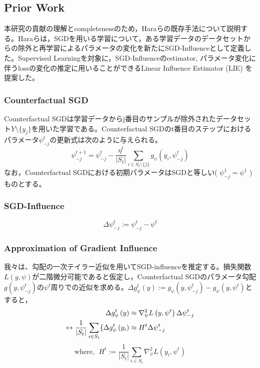 \documentclass{article}
\begin{document}
    \subsection{Prior Work}
        本研究の貢献の理解とcompletenessのため，Haraらの既存手法\cite{Hara2019}について説明する。Haraらは，SGDを用いる学習について，ある学習データのデータセットからの除外と再学習によるパラメータの変化を新たにSGD-Influenceとして定義した。Supervised Learningを対象に，SGD-Influenceのestimator, パラメータ変化に伴うlossの変化の推定に用いることができるLinear Influence Estimator (LIE) を提案した。
        \subsubsection{Counterfactual SGD}
            Counterfactual SGDは学習データからj番目のサンプルが除外されたデータセット\( Y\setminus\{y_j\}\)を用いた学習である。Counterfactual SGDのt番目のステップにおけるパラメータ\(\psi_{-j}^t\)の更新式は次のように与えられる。
            \begin{equation}
                \psi_{-j} ^{t+1} 
                = \psi_{-j} ^{t} 
                -\frac{\eta^{t}}{ \vert S_{t} \vert }  \sum _{i \in S_{t}\setminus\{j\}} g_\psi\left( y_{i},\psi_{-j}^{t}\right)
            \end{equation}
            なお，Counterfactual SGDにおける初期パラメータはSGDと等しい( \(\psi _{-j}^{1}= \psi ^{1} \) )ものとする。
        \subsubsection{SGD-Influence}
            
            \begin{equation}
              \Delta  \psi _{-j}^{t}:= \psi _{-j}^{t}- \psi ^{t}  
            \end{equation}
        
        \subsubsection{Approximation of Gradient Influence}
            我々は、勾配の一次テイラー近似を用いてSGD-influenceを推定する。損失関数\(L \left( y, \psi \right)\)が二階微分可能であると仮定し，Counterfactual SGDのパラメータ勾配\(g\left( y,\psi_{-j}^{t}\right)\)の\(\psi^t\)周りでの近似を求める。\(\Delta g_\psi^t\left( y \right) :=  g_{\psi} \left( y, \psi _{-j}^{t} \right) -g_{\psi} \left( y, \psi ^{t} \right)\)とすると，
            \begin{align}
                \Delta g_\psi^t\left( y \right) &\approx \nabla _{ \psi }^{2}L \left( y, \psi ^{t} \right) \Delta  \psi _{-j}^{t} \notag \\
                \leftrightarrow \frac{1}{ \vert S_{t} \vert } \sum _{i \in S_{t}} \{  \Delta g_\psi^t\left( y_i \right) &\approx H^{t} \Delta  \psi _{-j}^{t}
                \label{taylor}
            \end{align}
            \begin{equation*}
                \mathrm{where,~~}H^{t} := \frac{1}{ \vert S_{t} \vert } \sum _{i \in S_{t}}^{}\nabla _{ \psi }^{2}L \left( y_i, \psi ^{t} \right) 
            \end{equation*}
            
\end{document}

